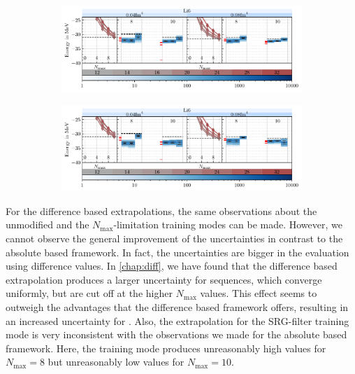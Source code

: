 \begin{figure}[H]
  \caption{Evaluation results for the  nucleus using the absolute \textbf{(a)} and the difference based extrapolation \textbf{(b)}. The shown training modes are, in order from left to right, the unmodified training mode for comparison, the $N_\mathrm{max}$-limitation training mode and the SRG-filter training mode. For each nucleus and each flow parameter, the NCSM sequences are shown on the left (the different frequencies are colored respectively to the legend, which shows the frequencies $\hbar\Omega$ in \si[]{\mega\electronvolt}) and the extrapolations for a given maximum $N_\mathrm{max}$ on the right. For each maximum $N_\mathrm{max}$, the variational boundary is shown as a dashed line, and the classical extrapolations are shown as red ticks.}

  \label{fig:eval_li6}
  \begin{subfigure}{\textwidth}
    \caption{}
    \includegraphics[width=\textwidth]{media/li6_evaluation_abs.pdf}
  \end{subfigure}
  \begin{subfigure}{\textwidth}
    \caption{}
    \includegraphics[width=\textwidth]{media/li6_evaluation_diff.pdf}
  \end{subfigure}
\end{figure}

For the difference based extrapolations, the same observations about the unmodified and the $N_\mathrm{max}$-limitation training modes can be made. However, we cannot observe the general improvement of the uncertainties in contrast to the absolute based framework. In fact, the uncertainties are bigger in the evaluation using difference values. In \autoref{chap:diff}, we have found that the difference based extrapolation produces a larger uncertainty for sequences, which converge uniformly, but are cut off at the higher $N_\mathrm{max}$ values. This effect seems to outweigh the advantages that the difference based framework offers, resulting in an increased uncertainty for . Also, the extrapolation for the SRG-filter training mode is very inconsistent with the observations we made for the absolute based framework. Here, the training mode produces unreasonably high values for $N_\mathrm{max} = 8$ but unreasonably low values for $N_\mathrm{max} = 10$.
